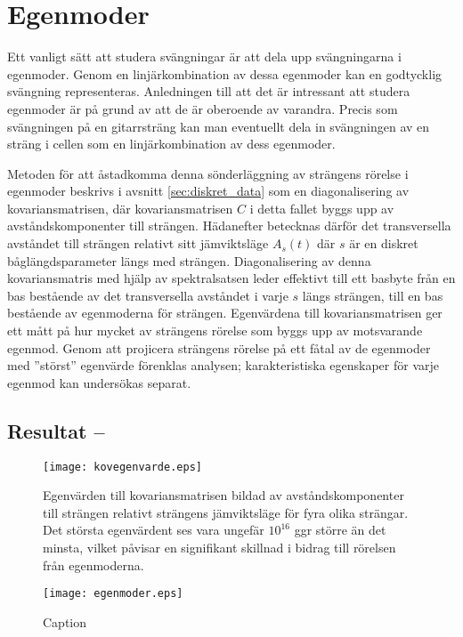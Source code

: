 \section{Egenmoder}
Ett vanligt sätt att studera svängningar är att dela upp svängningarna i egenmoder. Genom en linjärkombination av dessa egenmoder kan en godtycklig svängning representeras. Anledningen till att det är intressant att studera egenmoder är på grund av att de är oberoende av varandra. Precis som  svängningen på en gitarrsträng kan man eventuellt dela in svängningen av en sträng i cellen som en linjärkombination av dess egenmoder. 

Metoden för att åstadkomma denna sönderläggning av strängens rörelse i egenmoder beskrivs i avsnitt \ref{sec:diskret_data} som en diagonalisering av kovariansmatrisen, där kovariansmatrisen $C$ i detta fallet byggs upp av avståndskomponenter till strängen. Hädanefter betecknas därför det transversella avståndet till strängen relativt sitt jämviktsläge $A_s(t)$ där $s$ är en diskret båglängdsparameter längs med strängen. Diagonalisering av denna kovariansmatris med hjälp av spektralsatsen leder effektivt till ett basbyte från en bas bestående av det transversella avståndet i varje $s$ längs strängen, till en bas bestående av egenmoderna för strängen. Egenvärdena till kovariansmatrisen ger ett mått på hur mycket av strängens rörelse som byggs upp av motsvarande egenmod. Genom att projicera strängens rörelse på ett fåtal av de egenmoder med ''störst'' egenvärde förenklas analysen\cite{Shlens_PCA2014}; karakteristiska egenskaper för varje egenmod kan undersökas separat. 



\subsection{Resultat -- }

\begin{figure}
    \centering
    \texttt{[image: kovegenvarde.eps]}
    \caption{Egenvärden till kovariansmatrisen bildad av avståndskomponenter till strängen relativt strängens jämviktsläge för fyra olika strängar. Det största egenvärdent ses vara ungefär $10^{16}$ ggr större än det minsta, vilket påvisar en signifikant skillnad i bidrag till rörelsen från egenmoderna. }
    \label{fig:kovegenvarde}
\end{figure}

\begin{figure}
    \centering
    \texttt{[image: egenmoder.eps]}
    \caption{Caption}
    \label{fig:egenmoder}
\end{figure}


